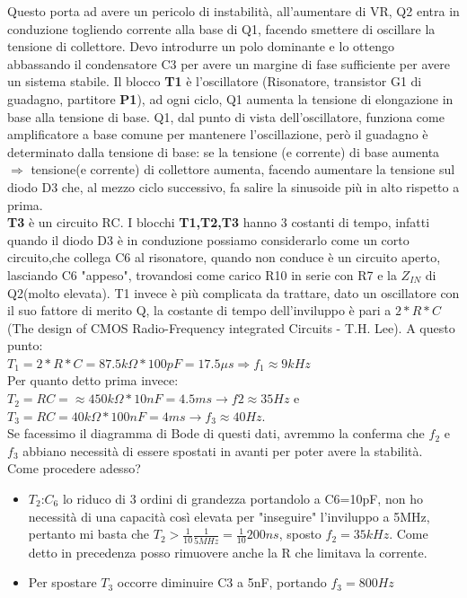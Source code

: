 \documentclass{article}
\begin{document}
Questo porta ad avere un pericolo di instabilità, all'aumentare di VR, Q2 entra in conduzione togliendo corrente alla base di Q1, facendo smettere di oscillare la tensione di collettore.
Devo introdurre un polo dominante e lo ottengo abbassando il condensatore C3 per avere un margine di fase sufficiente per avere un sistema stabile.
Il blocco \textbf{T1} è l'oscillatore (Risonatore, transistor G1 di guadagno, partitore \textbf{P1}), ad ogni ciclo, Q1 aumenta la tensione di elongazione in base alla tensione di base.
Q1, dal punto di vista dell'oscillatore, funziona come amplificatore a base comune per mantenere l'oscillazione, però il guadagno è determinato dalla tensione di base: se la tensione (e corrente) di base aumenta $\Rightarrow$ tensione(e corrente) di collettore aumenta, facendo aumentare la tensione sul diodo D3 che, al mezzo ciclo successivo, fa salire la sinusoide più in alto rispetto a prima.\\
\textbf{T3} è un circuito RC.
I blocchi \textbf{T1,T2,T3} hanno 3 costanti di tempo, infatti quando il diodo D3 è in conduzione possiamo considerarlo come un corto circuito,che collega C6 al risonatore, quando non conduce è un circuito aperto, lasciando C6 "appeso", trovandosi come carico R10 in serie con R7 e la $Z_{IN}$ di Q2(molto elevata).
T1 invece è più complicata da trattare, dato un oscillatore con il suo fattore di merito Q, la costante di tempo dell'inviluppo è pari a $2*R*C$ (The design of CMOS Radio-Frequency integrated Circuits - T.H. Lee).
A questo punto:\\ $T_1=2*R*C=87.5k\Omega *100pF=17.5\mu s \Rightarrow f_1\approx 9kHz$\\
Per quanto detto prima invece:\\ $T_2=RC=\approx 450k\Omega *10nF=4.5ms \rightarrow f2\approx 35Hz$ e\\ $T_3=RC=40k\Omega *100nF=4ms \rightarrow f_3\approx 40Hz$.\\
Se facessimo il diagramma di Bode di questi dati, avremmo la conferma che $f_2$ e  $f_3$ abbiano necessità di essere spostati in avanti per poter avere la stabilità.\\Come procedere adesso?\\
\begin{itemize}
\item $T_2$:$C_6$ lo riduco di 3 ordini di grandezza portandolo a C6=10pF, non ho necessità di una capacità così elevata per "inseguire" l'inviluppo a 5MHz, pertanto mi basta che $T_2>\frac{1}{10}\frac{1}{5MHz}=\frac{1}{10}200ns$, sposto $f_2=35kHz$.
Come detto in precedenza posso rimuovere anche la R che limitava la corrente.
\item Per spostare $T_3$ occorre diminuire C3 a 5nF, portando $f_3=800Hz$
\end{itemize}
\end{document}

